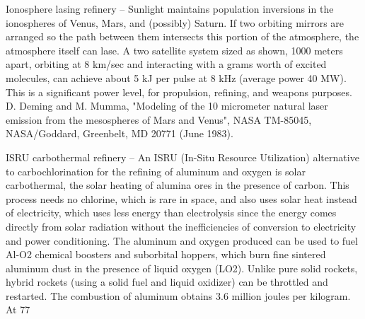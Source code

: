 \documentclass[a4paper]{book}
\begin{document}
Ionosphere lasing refinery – Sunlight maintains population inversions in the ionospheres of Venus, Mars, and (possibly) Saturn. If two orbiting mirrors are arranged so the path between them intersects this portion of the atmosphere, the atmosphere itself can lase.  A two satellite system sized as shown, 1000 meters apart, orbiting at 8 km/sec and interacting with a grams worth of excited molecules, can achieve about 5 kJ per pulse at 8 kHz (average power 40 MW).  This is a significant power level, for propulsion, refining, and weapons purposes. D. Deming and M. Mumma, "Modeling of the 10 micrometer natural laser emission from the mesospheres of Mars and Venus", NASA TM-85045, NASA/Goddard, Greenbelt, MD 20771 (June 1983).
 
ISRU carbothermal refinery – An ISRU (In-Situ Resource Utilization) alternative to carbochlorination for the refining of aluminum and oxygen is solar carbothermal, the solar heating of alumina ores in the presence of carbon. This process needs no chlorine, which is rare in space, and also uses solar heat instead of electricity, which uses less energy than electrolysis since the energy comes directly from solar radiation without the inefficiencies of conversion to electricity and power conditioning.  The aluminum and oxygen produced can be used to fuel Al-O2 chemical boosters and suborbital hoppers, which burn fine sintered aluminum dust in the presence of liquid oxygen (LO2). Unlike pure solid rockets, hybrid rockets (using a solid fuel and liquid oxidizer) can be throttled and restarted. The combustion of aluminum obtains 3.6 million joules per kilogram.  At 77%
 
\end{document}
